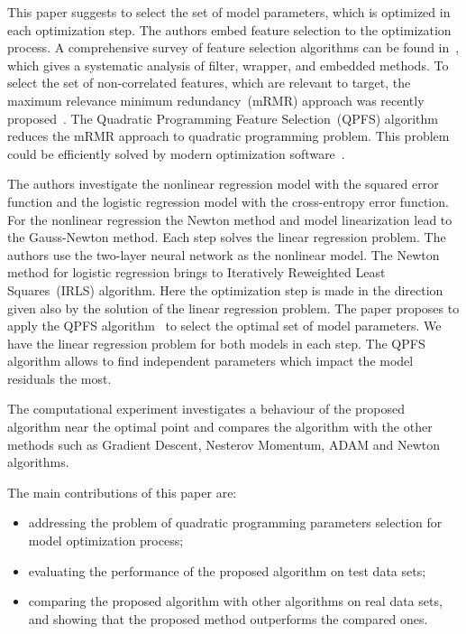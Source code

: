 \documentclass[a4paper,12pt]{article}
\theoremstyle{plain} %
\theoremstyle{definition} %
\theoremstyle{remark} %
\begin{document}
This paper suggests to select the set of model parameters, which is optimized in each optimization step.
The authors embed feature selection to the optimization process.
A comprehensive survey of feature selection algorithms can be found in~\cite{li2017feature}, which gives a systematic analysis of filter, wrapper, and embedded methods.
To select the set of non-correlated features, which are relevant to target, the maximum relevance minimum redundancy~(mRMR) approach was recently proposed~\cite{ding2005mrmr,yamada2014mrmr,peng2005feature}.
The Quadratic Programming Feature Selection~(QPFS) algorithm~\cite{katrutsa2017comprehensive,rodriguez2010qpfs} reduces the mRMR approach to quadratic programming problem. This problem could be efficiently solved by modern optimization software~\cite{bertsimas2016best}.

The authors investigate the nonlinear regression model with the squared error function and the logistic regression model with the cross-entropy error function.
For the nonlinear regression the Newton method and model linearization lead to the Gauss-Newton method. 
Each step solves the linear regression problem. 
The authors use the two-layer neural network as the nonlinear model. 
The Newton method for logistic regression brings to Iteratively Reweighted Least Squares~(IRLS) algorithm. 
Here the optimization step is made in the direction given also by the solution of the linear regression problem.
The paper proposes to apply the QPFS algorithm~\cite{katrutsa2017comprehensive,rodriguez2010qpfs} to select the optimal set of model parameters. We have the linear regression problem for both models in each step. The QPFS algorithm allows to find independent parameters which impact the model residuals the most.

The computational experiment investigates a behaviour of the proposed algorithm near the optimal point and compares the algorithm with the other methods such as Gradient Descent, Nesterov Momentum, ADAM and Newton algorithms. 
	
	The main contributions of this paper are:
	\begin{itemize}
	\item addressing the problem of quadratic programming parameters selection for model optimization process; 
	\item evaluating the performance of the proposed algorithm on test data sets;
	\item comparing the proposed algorithm with other algorithms on real data sets, and showing that the proposed method outperforms the compared ones.
	\end{itemize}
	
\end{document}
